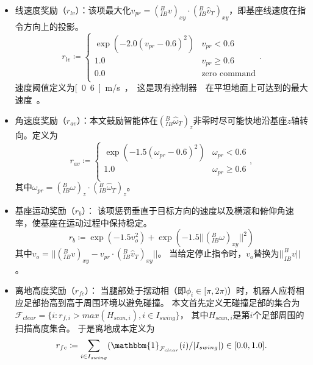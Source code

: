 \documentclass[9pt,twocolumn,twoside]{osajnl}
\begin{document}
\begin{itemize}
    \item 线速度奖励（$r_{lv}$）：该项最大化$v_{pr} = (^B_{IB}v)_{xy} \cdot (^{B}_{IB} \hat{v}_{T})_{xy}$，即基座线速度在指令方向上的投影。
    \begin{equation}
    r_{lv} \coloneqq
        \begin{cases}
            \exp{(-2.0 (v_{pr} - 0.6)^2)} & v_{pr} < 0.6 \\
            1.0  & v_{pr} \geq 0.6 \\
            0.0  & \text{zero command}\\
        \end{cases}.
    \end{equation}
    速度阈值定义为\unit[0.6]{m/s}，这是现有控制器~\cite{bellicoso2018dynamic}在平坦地面上可达到的最大速度。

   \item 角速度奖励（$r_{av}$）：本文鼓励智能体在$(^{B}_{IB}\hat{\omega}_{T})_{z}$非零时尽可能快地沿基座$z$轴转向。定义为
    \begin{equation}
    r_{av} \coloneqq
        \begin{cases}
            \exp{(- 1.5 ( \omega_{pr} - 0.6)^2)} & \omega_{pr} < 0.6 \\
            1.0  & \omega_{pr} \geq 0.6 \\
        \end{cases},
    \end{equation}
     其中$\omega_{pr} = (^B_{IB} \omega)_{z} \cdot (^{B}_{IB}\hat{\omega}_{T})_{z}$。

    \item 基座运动奖励（$r_{b}$）：
    该项惩罚垂直于目标方向的速度以及横滚和俯仰角速率，使基座在运动过程中保持稳定。
    \begin{equation}
      r_{b} \coloneqq \exp(- 1.5 v_{o}^2) + \exp( - 1.5 \lvert\lvert(^B_{IB} \omega)_{xy} \rvert\rvert^2)
    \end{equation}
   其中$v_{o} = \lvert\lvert (^B_{IB} v)_{xy} - v_{pr}\cdot (^{B}_{IB} \hat{v}_{T})_{xy} \rvert\rvert$。
    当给定停止指令时，$v_{o}$替换为$\lvert\lvert ^B_{IB} v\rvert\rvert$。

    \item 离地高度奖励（$r_{fc}$）：
    当腿部处于摆动相（即$\phi_i \in [\pi, 2\pi)$）时，机器人应将相应足部抬高到高于周围环境以避免碰撞。
    本文首先定义无碰撞足部的集合为$\mathcal{F}_{clear} = \{ i : r_{f,i} > max(H_{scan, i}) , i \in I_{swing} \}$，
    其中$H_{scan,i}$是第$i$个足部周围的扫描高度集合。
    于是离地成本定义为
    \begin{equation}
        r_{fc} \coloneqq \sum_{i \in I_{swing}}
        (\mathbbm{1}_{\mathcal{F}_{clear}}(i) / \lvert I_{swing} \rvert )
        \in [0.0, 1.0].
    \end{equation}


\end{itemize}
\end{document}
